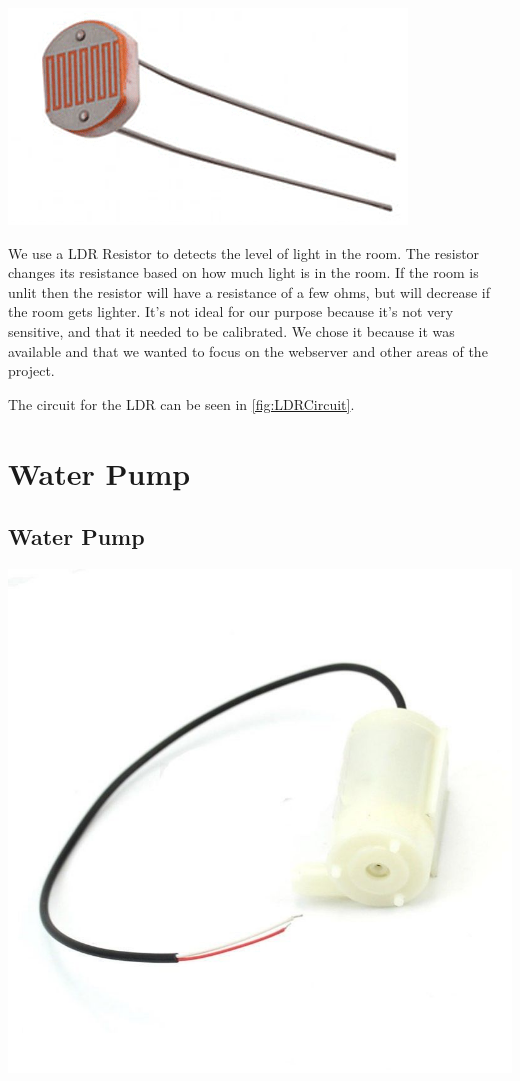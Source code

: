 \documentclass[a4paper,12pt,oneside,openright,titlepage]{book}
\begin{document}
\begin{center}
	\includegraphics[scale=0.80]{LDR-Resistor}
\end{center}


We use a LDR Resistor to detects the level of light in the room. The resistor changes its resistance based on how much light is in the room. If the room is unlit then the resistor will have a resistance of a few ohms, but will decrease if the room gets lighter. It's not ideal for our purpose because it's not very sensitive, and that it needed to be calibrated. We chose it because it was available and that we wanted to focus on the webserver and other areas of the project.

The circuit for the LDR can be seen in \ref{fig:LDRCircuit}.

\section{Water Pump}
\subsection{Water Pump}
\begin{center}
	\includegraphics[scale=0.3]{Water-Pump}
\end{center}
\end{document}

